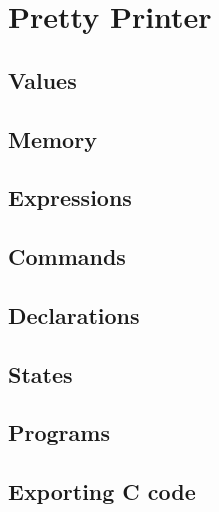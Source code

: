 \chapter{Pretty Printer}\label{chapter:pretty}

\section{Values}
\section{Memory}
\section{Expressions}
\section{Commands}
\section{Declarations}
\section{States}
\section{Programs}
\section{Exporting C code}
